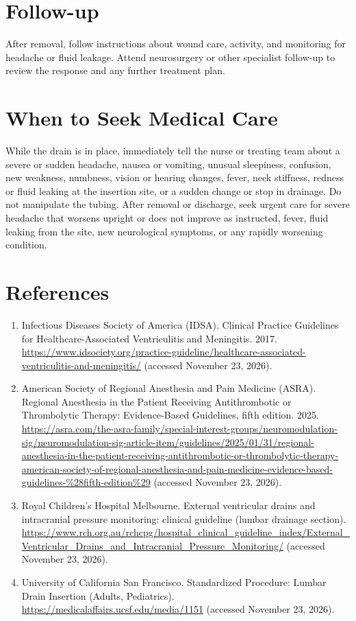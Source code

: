 \section*{Follow-up}
After removal, follow instructions about wound care, activity, and monitoring for headache or fluid leakage. Attend neurosurgery or other specialist follow-up to review the response and any further treatment plan.

\section*{When to Seek Medical Care}
While the drain is in place, immediately tell the nurse or treating team about a severe or sudden headache, nausea or vomiting, unusual sleepiness, confusion, new weakness, numbness, vision or hearing changes, fever, neck stiffness, redness or fluid leaking at the insertion site, or a sudden change or stop in drainage. Do not manipulate the tubing. After removal or discharge, seek urgent care for severe headache that worsens upright or does not improve as instructed, fever, fluid leaking from the site, new neurological symptoms, or any rapidly worsening condition.

\section*{References}
\begin{enumerate}
  \item Infectious Diseases Society of America (IDSA). Clinical Practice Guidelines for Healthcare-Associated Ventriculitis and Meningitis. 2017. \url{https://www.idsociety.org/practice-guideline/healthcare-associated-ventriculitis-and-meningitis/} (accessed November 23, 2026).
  \item American Society of Regional Anesthesia and Pain Medicine (ASRA). Regional Anesthesia in the Patient Receiving Antithrombotic or Thrombolytic Therapy: Evidence-Based Guidelines, fifth edition. 2025. \url{https://asra.com/the-asra-family/special-interest-groups/neuromodulation-sig/neuromodulation-sig-article-item/guidelines/2025/01/31/regional-anesthesia-in-the-patient-receiving-antithrombotic-or-thrombolytic-therapy-american-society-of-regional-anesthesia-and-pain-medicine-evidence-based-guidelines-%28fifth-edition%29} (accessed November 23, 2026).
  \item Royal Children's Hospital Melbourne. External ventricular drains and intracranial pressure monitoring: clinical guideline (lumbar drainage section). \url{https://www.rch.org.au/rchcpg/hospital_clinical_guideline_index/External_Ventricular_Drains_and_Intracranial_Pressure_Monitoring/} (accessed November 23, 2026).
  \item University of California San Francisco. Standardized Procedure: Lumbar Drain Insertion (Adults, Pediatrics). \url{https://medicalaffairs.ucsf.edu/media/1151} (accessed November 23, 2026).
\end{enumerate}

\clearpage
